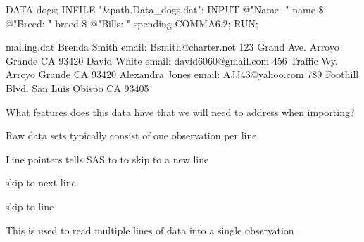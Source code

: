 \begin{frame}[fragile]
\footnotesize
\begin{code}{.0}
DATA dogs;
INFILE "\&path.Data_dogs.dat";
INPUT @"Name- " name \$
      @"Breed: " breed \$
      @"Bills: " spending COMMA6.2;
RUN;
\end{code}
\emp
\end{frame}




\begin{frame}[fragile]
\footnotesize
\begin{craw}{.0}{mailing.dat}
Brenda Smith  email: Bsmith@charter.net
123 Grand Ave.
Arroyo Grande  CA 93420
David White  email: david6060@gmail.com
456 Traffic Wy.
Arroyo Grande  CA 93420
Alexandra Jones  email: AJJ43@yahoo.com
789 Foothill Blvd.
San Luis Obispo  CA 93405
\end{craw}
\emp
{} \hspace{0.05in} \emp
{}
\oyo What features does this data have that we will need to address when importing?
\emp
\end{frame}

\begin{frame}
\bi
\item Raw data sets typically consist of one observation per line
\item Line pointers tells SAS to to skip to a new line
\bi
\item \fbox{\ttt{/}} skip to next line
\item {} skip to line 
\ei
\item This is used to read multiple lines of data into a single observation
\ei
\end{frame}

\begin{frame}[fragile]
\footnotesize
{}
\emp
\end{frame}


